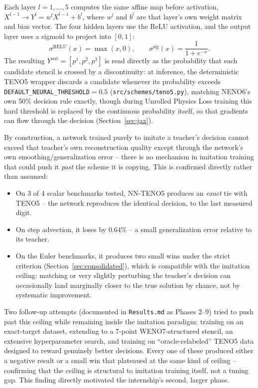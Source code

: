 \documentclass[11pt]{article}
\begin{document}
Each layer $l=1,\dots,5$ computes the same affine map before activation,
$X^{l-1} \to Y^l = w^l X^{l-1} + b^l$, where $w^l$ and $b^l$ are that
layer's own weight matrix and bias vector. The four hidden layers use the
ReLU activation, and the output layer uses a sigmoid to project into
$[0,1]$:
\[
\sigma^{\text{RELU}}(x) = \max(x, 0), \qquad
\sigma^{\text{sig}}(x) = \frac{1}{1+e^{-x}}.
\]
The resulting $Y^{\text{out}} = [p^1,p^2,p^3]$ is read directly as the
probability that each candidate stencil is crossed by a discontinuity: at
inference, the deterministic TENO5 wrapper discards a candidate whenever
its probability exceeds \texttt{DEFAULT\_NEURAL\_THRESHOLD}$=0.5$
(\texttt{src/schemes/teno5.py}), matching NENO6's own 50\% decision rule
exactly, though during Unrolled Physics Loss training this hard threshold
is replaced by the continuous probability itself, so that gradients can
flow through the decision (Section~\ref{sec:jax}).

By construction, a network trained purely to imitate a teacher's decision
cannot exceed that teacher's own reconstruction quality except through the
network's own smoothing/generalization error -- there is no mechanism in
imitation training that could push it \emph{past} the scheme it is copying.
This is confirmed directly rather than assumed:

\begin{itemize}
    \item On 3 of 4 scalar benchmarks tested, NN-TENO5 produces an
    \emph{exact} tie with TENO5 -- the network reproduces the identical
    decision, to the last measured digit.
    \item On step advection, it loses by $0.64\%$ -- a small
    generalization error relative to its teacher.
    \item On the Euler benchmarks, it produces two small wins under the
    strict criterion (Section~\ref{sec:consolidated}), which is compatible
    with the imitation ceiling: matching or very slightly perturbing the
    teacher's decision can occasionally land marginally closer to the true
    solution by chance, not by systematic improvement.
\end{itemize}

Two follow-up attempts (documented in \texttt{Results.md} as Phases 2--9)
tried to push past this ceiling while remaining inside the imitation
paradigm: training on an exact-target dataset, extending to a 7-point
WENO7-structured stencil, an extensive hyperparameter search, and training
on ``oracle-relabeled'' TENO5 data designed to reward genuinely better
decisions. Every one of these produced either a negative result or a small
win that plateaued at the same kind of ceiling -- confirming that the
ceiling is structural to imitation training itself, not a tuning gap. This
finding directly motivated the internship's second, larger phase.
\end{document}
